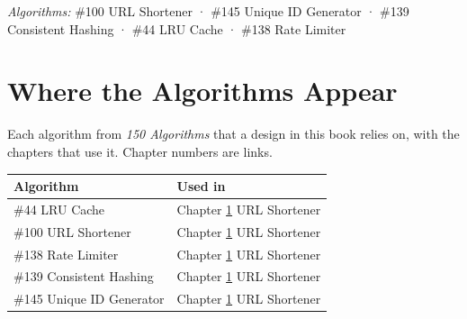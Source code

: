 \documentclass[
  letterpaper,
  oneside,
  11pt,
  openany]{scrbook}
\begin{document}
\emph{Algorithms:} \#100 URL Shortener · \#145 Unique ID Generator ·
\#139 Consistent Hashing · \#44 LRU Cache · \#138 Rate Limiter

\clearpage

\chapter{Where the Algorithms Appear}\label{algorithm-index}


Each algorithm from \emph{150 Algorithms} that a design in this book
relies on, with the chapters that use it. Chapter numbers are links.

\begin{longtable}[]{@{}
  >{\raggedright\arraybackslash}p{}
  >{\raggedright\arraybackslash}p{}@{}}
\toprule\noalign{}
\begin{minipage}[b]{\linewidth}\raggedright
Algorithm
\end{minipage} & \begin{minipage}[b]{\linewidth}\raggedright
Used in
\end{minipage} \\
\midrule\noalign{}
\endhead
\bottomrule\noalign{}
\endlastfoot
\#44 LRU Cache & Chapter \hyperref[d1]{1} URL Shortener \\
\#100 URL Shortener & Chapter \hyperref[d1]{1} URL Shortener \\
\#138 Rate Limiter & Chapter \hyperref[d1]{1} URL Shortener \\
\#139 Consistent Hashing & Chapter \hyperref[d1]{1} URL Shortener \\
\#145 Unique ID Generator & Chapter \hyperref[d1]{1} URL Shortener \\
\end{longtable}

\backmatter
\end{document}
